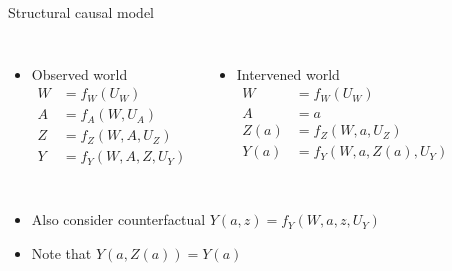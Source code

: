 \documentclass{beamer}
\begin{document}
\begin{frame}[noframenumbering]
  \thispagestyle{empty}
  \titlepage
\end{frame}


\begin{frame}{Structural causal model}
  \begin{columns}[c]
    \begin{itemize}
    \item     Observed world
      \begin{align*}
        W&=f_W(U_W)\\
        A&=f_A(W, U_A)\\
        Z&=f_Z(W, A, U_Z)\\
        Y&=f_Y(W, A, Z, U_Y)
      \end{align*}
    \end{itemize}
    \begin{itemize}
    \item     Intervened world
      \begin{align*}
        W&=f_W(U_W)\\
        A&=a\\
        Z(a)&=f_Z(W, a, U_Z)\\
        Y(a)&=f_Y(W, a, Z(a), U_Y)
      \end{align*}
    \end{itemize}
  \end{columns}

  \vspace{2mm}

  \begin{itemize}
    \item Also consider counterfactual $Y(a, z)=f_Y(W,
      a, z, U_Y)$
    \item Note that $Y(a, Z(a))=Y(a)$
  \end{itemize}
  \begin{figure}[!htb]
    \centering
    \end{figure}

\note{
}

\end{frame}
\end{document}
